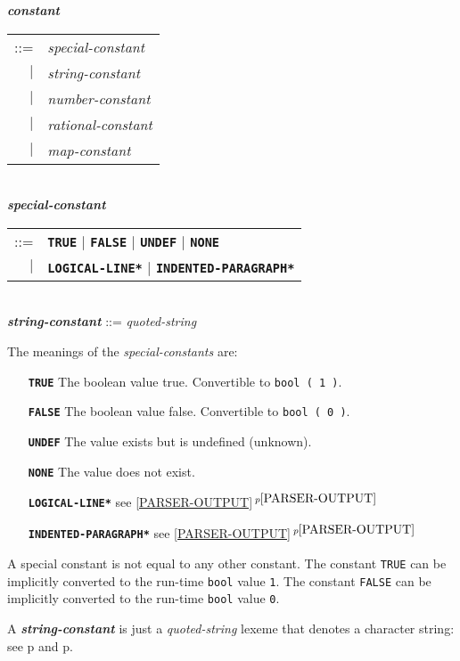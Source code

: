 \documentclass[12pt]{article}
\newcommand{\TT}[1]{{\tt \bfseries #1}}
\newcommand{\ttkey}[1]{{\tt \bfseries #1}}
\newcommand{\emkey}[1]{{\em \bfseries #1}}
\newcommand{\itemref}[1]{\ref{#1}$\,^{p\pageref{#1}}$}
\newcommand{\pagref}[1]{p\pageref{#1}}
\newenvironment{indpar}[1][0.3in]%
	{\begin{list}{}%
		     {\setlength{\itemsep}{0in}%
		      \setlength{\topsep}{0in}%
		      \setlength{\parsep}{1ex}%
		      \setlength{\labelwidth}{#1}%
		      \setlength{\leftmargin}{#1}%
		      \addtolength{\leftmargin}{\labelsep}}%
	 \item}%
	{\end{list}}
\begin{document}
\begin{indpar}
\emkey{constant}\label{CONSTANT}
    \begin{tabular}[t]{rl}
    ::= & {\em special-constant} \\
    $|$ & {\em string-constant} \\
    $|$ & {\em number-constant} \\
    $|$ & {\em rational-constant} \\
    $|$ & {\em map-constant} \\
    \end{tabular} \\
\emkey{special-constant} 
    \begin{tabular}[t]{@{}rl}
    ::= & \ttkey{TRUE} $|$ \ttkey{FALSE}
                       $|$ \ttkey{UNDEF} $|$ \ttkey{NONE} \\
    $|$ & \ttkey{*LOGICAL-LINE*} $|$ \ttkey{*INDENTED-PARAGRAPH*} \\
    \end{tabular} \\
\emkey{string-constant} ::= {\em quoted-string}
\end{indpar}

The meanings of the {\em special-constants} are:
\begin{indpar}[1.6in]
\begin{itemize}
\item[\TT{TRUE}] The boolean value true.  Convertible to {\tt bool ( 1 )}.
\item[\TT{FALSE}] The boolean value false.  Convertible to {\tt bool ( 0 )}.
\item[\TT{UNDEF}] The value exists but is undefined (unknown).
\item[\TT{NONE}] The value does not exist.
\item[\TT{*LOGICAL-LINE*}] see \itemref{PARSER-OUTPUT}
\item[\TT{*INDENTED-PARAGRAPH*}] see \itemref{PARSER-OUTPUT}
\end{itemize}
\end{indpar}
A special constant is not equal to any other constant.
The constant {\tt TRUE} can be implicitly converted to the
run-time {\tt bool} value {\tt 1}.
The constant {\tt FALSE} can be implicitly converted to the
run-time {\tt bool} value {\tt 0}.

A \emkey{string-constant} is just a {\em quoted-string} lexeme
that denotes a character string: see
\pagref{QUOTED-STRING} and \pagref{QUOTED-STRING-CONCATENATION}.
\end{document}
